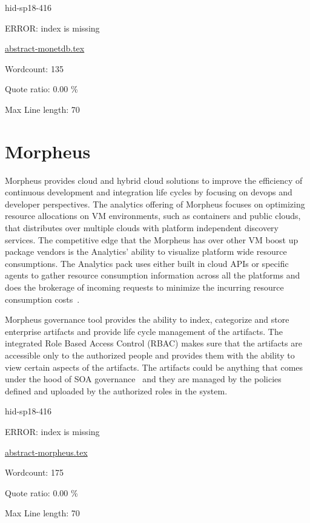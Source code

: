 \begin{IU}

hid-sp18-416

ERROR: index is missing

\href{https://github.com/cloudmesh-community/hid-sp18-416/blob/master//technology/abstract-monetdb.tex}{abstract-monetdb.tex}

 

Wordcount: 135


Quote ratio: 0.00 \%
 
Max Line length: 70
\end{IU}

\section{Morpheus}

Morpheus provides cloud and hybrid cloud solutions to improve the
efficiency of continuous development and integration life cycles by
focusing on devops and developer perspectives. The analytics offering
of Morpheus focuses on optimizing resource allocations on VM
environments, such as containers and public clouds, that distributes
over multiple clouds with platform independent discovery services. The
competitive edge that the Morpheus has over other VM boost up package
vendors is the Analytics' ability to visualize platform wide resource
consumptions. The Analytics pack uses either built in cloud APIs or
specific agents to gather resource consumption information across all
the platforms and does the brokerage of incoming requests to minimize
the incurring resource consumption
costs~\cite{hid-sp18-416-www-morpheus-product-guide}.

Morpheus governance tool provides the ability to index, categorize and
store enterprise artifacts and provide life cycle management of the
artifacts. The integrated Role Based Access Control (RBAC) makes sure
that the artifacts are accessible only to the authorized people and
provides them with the ability to view certain aspects of the
artifacts. The artifacts could be anything that comes under the hood
of SOA governance~\cite{hid-sp18-416-www-soa-governance-wikipedia} and
they are managed by the policies defined and uploaded by the
authorized roles in the system.


\begin{IU}

hid-sp18-416

ERROR: index is missing

\href{https://github.com/cloudmesh-community/hid-sp18-416/blob/master//technology/abstract-morpheus.tex}{abstract-morpheus.tex}

 

Wordcount: 175


Quote ratio: 0.00 \%
 
Max Line length: 70
\end{IU}

